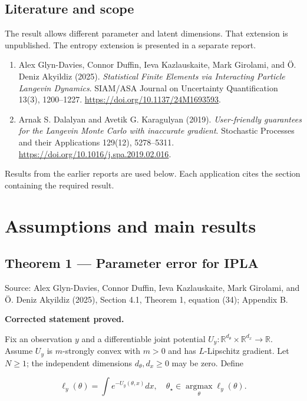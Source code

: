 \documentclass[11pt,a4paper]{report}
\begin{document}
\section*{Literature and scope}
The result allows different parameter and latent dimensions. That extension is unpublished. The entropy extension is presented in a separate report.

\begin{enumerate}
\item Alex Glyn-Davies, Connor Duffin, Ieva Kazlauskaite, Mark Girolami, and Ö. Deniz Akyildiz (2025). \emph{Statistical Finite Elements via Interacting Particle Langevin Dynamics}. SIAM/\allowbreak{}ASA Journal on Uncertainty Quantification 13(3), 1200–1227. \url{https://doi.org/10.1137/24M1693593}.
\item Arnak S. Dalalyan and Avetik G. Karagulyan (2019). \emph{User-friendly guarantees for the Langevin Monte Carlo with inaccurate gradient}. Stochastic Processes and their Applications 129(12), 5278–5311. \url{https://doi.org/10.1016/j.spa.2019.02.016}.
\end{enumerate}
Results from the earlier reports \cite{LangevinLean2026ULASC} are used below. Each application cites the section containing the required result.

\tableofcontents
\clearpage
{}
\chapter{Assumptions and main results}
\section{\texorpdfstring{Theorem 1 — Parameter error for IPLA}{Theorem 1 — Parameter error for IPLA}}


Source: Alex Glyn-Davies, Connor Duffin, Ieva Kazlauskaite, Mark Girolami, and Ö. Deniz Akyildiz (2025), Section 4.1, Theorem 1, equation (34); Appendix B.



\textbf{Corrected statement proved.}



Fix an observation \(y\) and a differentiable joint potential \(U_y:\mathbb R^{d_\theta}\times\mathbb R^{d_x}\to\mathbb R\). Assume \(U_y\) is \(m\)-strongly convex with \(m>0\) and has \(L\)-Lipschitz gradient. Let \(N\ge1\); the independent dimensions \(d_\theta,d_x\ge0\) may be zero. Define


\[\ell_y(\theta)=\int e^{-U_y(\theta,x)}dx,\quad
\theta_\star\in\operatorname*{argmax}_\theta\ell_y(\theta).\]
\end{document}
